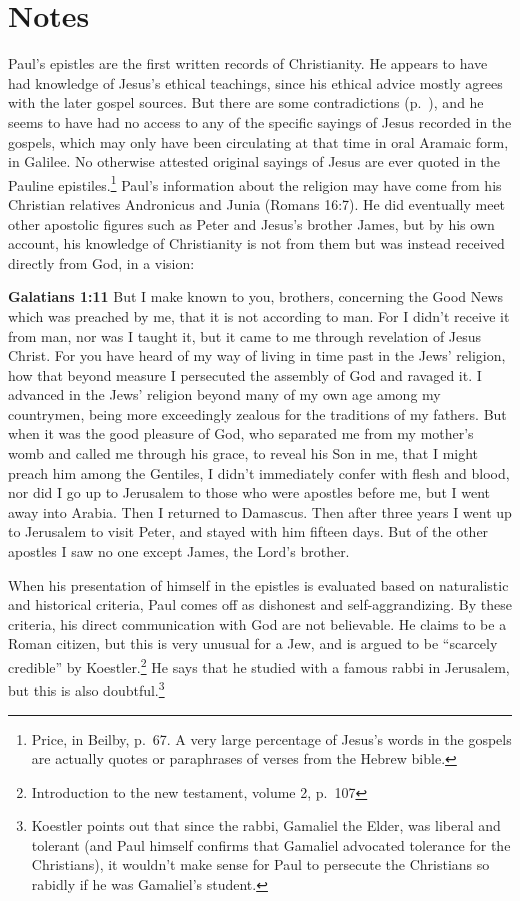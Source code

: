 \documentclass[10pt,twoside]{article} %
\newcommand{\quotesize}{\normalsize{}}
\newcommand{\maintextquotesize}{\renewcommand{\quotesize}{\large{}}}
\newcommand{\notequotesize}{\renewcommand{\quotesize}{\normalsize{}}}
\newenvironment{quotetext}{\begingroup\quotesize}{\endgroup}
\newcommand{\intex}[1]{\index[texts]{#1}}
\newcommand{\reftex}[1]{#1\intex{#1}}
\newcommand{\bible}[2]{\begin{quotetext}\textbf{#1}\intex{#1} #2\end{quotetext}}
\newenvironment{notesection}[1]{
  \setcounter{secnumdepth}{0}          %
  \section*{#1}
  \setcounter{secnumdepth}{2}          %
  \notequotesize
}%
{
  \maintextquotesize
}
\begin{document}
\begin{notesection}{Notes}
Paul's epistles are the first written records of Christianity. He appears to have had knowledge of
Jesus's ethical teachings, since his ethical advice mostly agrees with the later gospel sources.
But there are some contradictions (p.~\pageref{paul-contradicts-gospels}), and he seems to have had
no access to any of the specific sayings of Jesus recorded in the gospels, which may only have been
circulating at that time in oral Aramaic form, in Galilee. No otherwise attested original sayings of Jesus are ever quoted in the Pauline
epistiles.\footnote{Price, in Beilby, p.~67. A very large percentage of Jesus's words in the gospels are actually quotes or paraphrases of verses from the Hebrew bible.}
Paul's information about the religion may have come from his Christian relatives Andronicus and Junia (\reftex{Romans 16:7}).
He did eventually meet other apostolic figures such as Peter and Jesus's brother James, but
by his own account, his knowledge of Christianity is not from them but was instead
received directly from God, in a vision:


\bible{Galatians 1:11}{
But I make known to you, brothers, concerning the Good News which was preached by me, that it is not according to man.   For I didn't receive it from man, nor was I taught it, but it came to me through revelation of Jesus Christ.   For you have heard of my way of living in time past in the Jews' religion, how that beyond measure I persecuted the assembly of God and ravaged it.   I advanced in the Jews' religion beyond many of my own age among my countrymen, being more exceedingly zealous for the traditions of my fathers.   But when it was the good pleasure of God, who separated me from my mother's womb and called me through his grace,   to reveal his Son in me, that I might preach him among the Gentiles, I didn't immediately confer with flesh and blood,   nor did I go up to Jerusalem to those who were apostles before me, but I went away into Arabia. Then I returned to Damascus.
  Then after three years I went up to Jerusalem to visit Peter, and stayed with him fifteen days.   But of the other apostles I saw no one except James, the Lord's brother. 
}

When his presentation of himself in the epistles is evaluated based on naturalistic
and historical criteria, Paul comes off as dishonest and self-aggrandizing. By these
criteria, his direct communication with God are not believable. He claims to be a Roman citizen, but
this is very unusual for a Jew, and is argued to be ``scarcely credible'' by Koestler.\footnote{Introduction to the new testament, volume 2, p.~107}
He says that he studied with a famous rabbi in Jerusalem, but this is also doubtful.\footnote{Koestler points out that
since the rabbi, Gamaliel the Elder, was liberal and tolerant (and Paul himself confirms that Gamaliel advocated tolerance
for the Christians), it wouldn't make sense for Paul to
persecute the Christians so rabidly if he was Gamaliel's student.}


\end{notesection}
\end{document}
